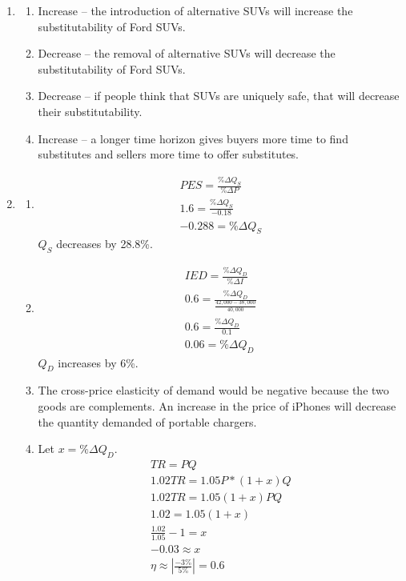 \documentclass{article}
\begin{document}
\begin{enumerate}

\item

	\begin{enumerate}
	
	\item Increase -- the introduction of alternative SUVs will increase the substitutability of Ford SUVs.
	
	\item Decrease -- the removal of alternative SUVs will decrease the substitutability of Ford SUVs.
	
	\item Decrease -- if people think that SUVs are uniquely safe, that will decrease their substitutability. 
	
	\item Increase -- a longer time horizon gives buyers more time to find substitutes and sellers more time to offer substitutes.
	
	\end{enumerate}
	
\item

	\begin{enumerate}
	
	\item
		\begin{gather*}
		PES = \frac{\% \Delta Q_S}{\% \Delta P} \\
		1.6 = \frac{\% \Delta Q_S}{-0.18} \\
		-0.288 = \% \Delta Q_S
		\end{gather*}
		$Q_S$ decreases by 28.8\%.
		
	\item
		\begin{gather*}
		IED = \frac{\% \Delta Q_D}{\% \Delta I} \\
		0.6 = \frac{\% \Delta Q_D}{ \frac{42,000 - 38,000}{40,000} } \\
		0.6 = \frac{\% \Delta Q_D}{0.1} \\
		0.06 = \% \Delta Q_D
		\end{gather*}
		$Q_D$ increases by 6\%.
		
	\item The cross-price elasticity of demand would be negative because the two goods are complements. An increase in the price of iPhones will decrease the quantity demanded of portable chargers.
	
	\item Let $x = \% \Delta Q_D$.
		\begin{gather*}
		TR = PQ \\
		1.02TR = 1.05P*(1 + x)Q \\
		1.02TR = 1.05(1 + x) PQ \\
		1.02 = 1.05(1 + x) \\
		\frac{1.02}{1.05} - 1 = x \\
		-0.03 \approx x
		\\
		\eta \approx \left| \frac{-3\%}{5\%} \right| = 0.6
		\end{gather*}
	

\end{enumerate}
\end{enumerate}
\end{document}
